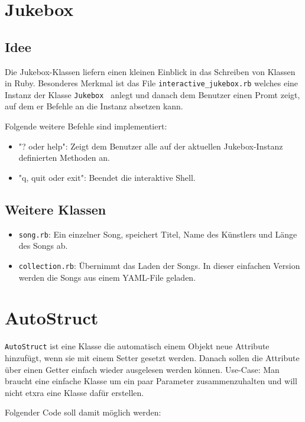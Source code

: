 \documentclass[a4book,11pt,twoside]{scrbook}
\begin{document}
\section{Jukebox}
\subsection*{Idee}
Die Jukebox-Klassen liefern einen kleinen Einblick in das Schreiben von Klassen in Ruby. Besonderes Merkmal ist das File \texttt{interactive\_jukebox.rb} welches eine Instanz der Klasse \texttt{Jukebox	} anlegt und danach dem Benutzer einen Promt zeigt, auf dem er Befehle an die Instanz absetzen kann.

Folgende weitere Befehle sind implementiert:

\begin{itemize}
\item "? oder help": Zeigt dem Benutzer alle auf der aktuellen Jukebox-Instanz definierten Methoden an.
\item "q, quit oder exit": Beendet die interaktive Shell.
\end{itemize}


\subsection*{Weitere Klassen}

\begin{itemize}
\item \texttt{song.rb}: Ein einzelner Song, speichert Titel, Name des Künstlers und Länge des Songs ab.
\item \texttt{collection.rb}: Übernimmt das Laden der Songs. In dieser einfachen Version werden die Songs aus einem YAML-File geladen. 
\end{itemize}




\section{AutoStruct} %
\label{sec:autostruct}
\texttt{AutoStruct} ist eine Klasse die automatisch einem Objekt neue Attribute hinzufügt, wenn sie mit einem Setter gesetzt werden. Danach sollen die Attribute über einen Getter einfach wieder ausgelesen werden können. Use-Case: Man braucht eine einfache Klasse um ein paar Parameter zusammenzuhalten und will nicht etxra eine Klasse dafür erstellen.

Folgender Code soll damit möglich werden:
\end{document}
